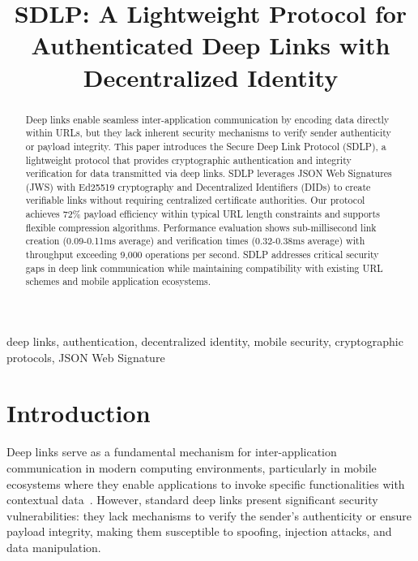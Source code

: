 \documentclass[conference]{IEEEtran}
\begin{document}
\title{SDLP: A Lightweight Protocol for Authenticated Deep Links with Decentralized Identity}

\author{
}

\maketitle

\begin{abstract}
Deep links enable seamless inter-application communication by encoding data directly within URLs, but they lack inherent security mechanisms to verify sender authenticity or payload integrity. This paper introduces the Secure Deep Link Protocol (SDLP), a lightweight protocol that provides cryptographic authentication and integrity verification for data transmitted via deep links. SDLP leverages JSON Web Signatures (JWS) with Ed25519 cryptography and Decentralized Identifiers (DIDs) to create verifiable links without requiring centralized certificate authorities. Our protocol achieves 72\% payload efficiency within typical URL length constraints and supports flexible compression algorithms. Performance evaluation shows sub-millisecond link creation (0.09-0.11ms average) and verification times (0.32-0.38ms average) with throughput exceeding 9,000 operations per second. SDLP addresses critical security gaps in deep link communication while maintaining compatibility with existing URL schemes and mobile application ecosystems.
\end{abstract}

\begin{IEEEkeywords}
deep links, authentication, decentralized identity, mobile security, cryptographic protocols, JSON Web Signature
\end{IEEEkeywords}

\section{Introduction}

Deep links serve as a fundamental mechanism for inter-application communication in modern computing environments, particularly in mobile ecosystems where they enable applications to invoke specific functionalities with contextual data~\cite{android-app-links, ios-universal-links}. However, standard deep links present significant security vulnerabilities: they lack mechanisms to verify the sender's authenticity or ensure payload integrity, making them susceptible to spoofing, injection attacks, and data manipulation.
\end{document}
